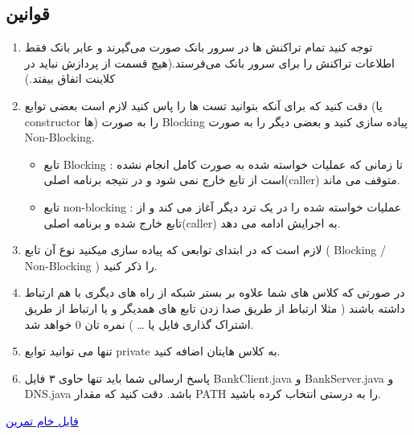 \documentclass[]{article}
\begin{document}
\subsection*{قوانین}
\begin{enumerate}
\item توجه کنید تمام تراکنش ها در سرور بانک صورت می‌گیرند و عابر بانک فقط اطلاعات تراکنش را برای سرور بانک می‌فرستد.(هیچ قسمت از پردازش نباید در کلاینت اتفاق بیفتد.)

\item دقت کنید که برای آنکه بتوانید تست ها را پاس کنید لازم است بعضی توابع (یا constructor ها) را به صورت Blocking پیاده سازی کنید و بعضی دیگر را به صورت Non-Blocking.

\begin{itemize}

\item  تابع Blocking : تا زمانی که عملیات خواسته شده به صورت کامل انجام نشده است از تابع خارج نمی شود و در نتیجه برنامه اصلی(caller) متوقف می ماند.

\item تابع non-blocking : عملیات خواسته شده را در یک ترد دیگر آغاز می کند و از تابع خارج شده و برنامه اصلی(caller) به اجرایش ادامه می دهد.
\end{itemize}
\item لازم است که در ابتدای توابعی که پیاده سازی میکنید نوع آن تابع ( Blocking / Non-Blocking ) را ذکر کنید.

\item در صورتی که کلاس های شما علاوه بر بستر شبکه از راه های دیگری با هم ارتباط داشته باشند ( مثلا ارتباط از طریق صدا زدن تابع های همدیگر و یا ارتباط از طریق اشتراک گذاری فایل یا … ) نمره تان 0 خواهد شد.

\item تنها می توانید توابع private به کلاس هایتان اضافه کنید.

\item پاسخ ارسالی شما باید تنها حاوی ۳ فایل BankClient.java و BankServer.java و DNS.java باشد. دقت کنید که مقدار PATH را به درستی انتخاب کرده باشید.
\end{enumerate}
\href{https://drive.google.com/file/d/1Dgctsm70HYfSigvVXSCh3eeo7Ozf6Oxb/view?usp=sharing}{\textcolor{blue}{فایل خام تمرین}}
\end{document}
